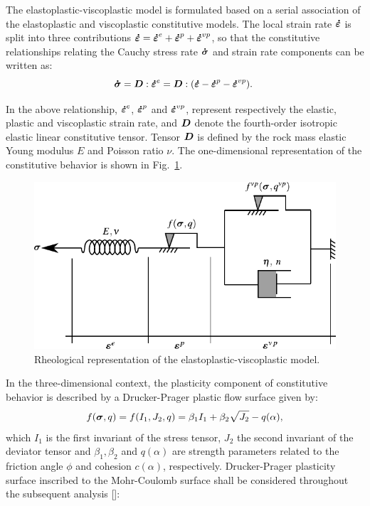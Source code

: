 \documentclass[a4paper,fleqn]{cas-sc}
\begin{document}
The elastoplastic-viscoplastic model is formulated based on a serial association of the elastoplastic and viscoplastic constitutive models. The local strain rate $\boldsymbol{\dot{\varepsilon}}$ is split into three contributions $\boldsymbol{\dot{\varepsilon}} = \boldsymbol{\dot{\varepsilon}}^{e} + \boldsymbol{\dot{\varepsilon}}^{p} + \boldsymbol{\dot{\varepsilon}}^{vp}$, so that the constitutive relationships relating the Cauchy stress rate $\boldsymbol{\dot{\sigma}}$ and strain rate components can be written as:
\begin{equation} \label{eq_constitutive_relationship_epvp}
	\boldsymbol{\dot{\sigma}} = \boldsymbol{D} : \boldsymbol{\dot{\varepsilon}}^{e} = \boldsymbol{D} : (\boldsymbol{\dot{\varepsilon}} - \boldsymbol{\dot{\varepsilon}}^{p} - \boldsymbol{\dot{\varepsilon}}^{vp}).\;
\end{equation}

In the above relationship, $\boldsymbol{\dot{\varepsilon}}^{e}$, $\boldsymbol{\dot{\varepsilon}}^{p}$ and $\boldsymbol{\dot{\varepsilon}}^{vp}$, represent respectively the elastic, plastic and viscoplastic strain rate, and $\boldsymbol{D}$ denote the fourth-order isotropic elastic linear constitutive tensor. Tensor $\boldsymbol{D}$ is defined by the rock mass elastic Young modulus $E$ and Poisson ratio $\nu$. The one-dimensional representation of the constitutive behavior is shown in Fig.~\ref{reological_scheme}.
\begin{figure}[h!]
	\centering
	\includegraphics[scale=1]{Rheological representation.pdf}
	\caption{Rheological representation of the elastoplastic-viscoplastic model.}
	\label{reological_scheme}
\end{figure}
\FloatBarrier
In the three-dimensional context, the plasticity component of constitutive behavior is described by a Drucker-Prager plastic flow surface given by:
\begin{equation}
	\label{eq:f_Drucker_Prager}
	f(\boldsymbol{\sigma},q) = f(I_1,J_2,q) = \beta_1 I_1 +\beta_2 \sqrt{J_2}-q(\alpha),
\end{equation}
which $I_1$ is the first invariant of the stress tensor, $J_2$ the second invariant of the deviator tensor and $\beta_1, \beta_2$ and $q(\alpha)$ are strength parameters related to the friction angle $\phi$ and cohesion $c(\alpha)$, respectively. Drucker-Prager plasticity surface inscribed to the Mohr-Coulomb surface shall be considered throughout the subsequent analysis []:
\end{document}
